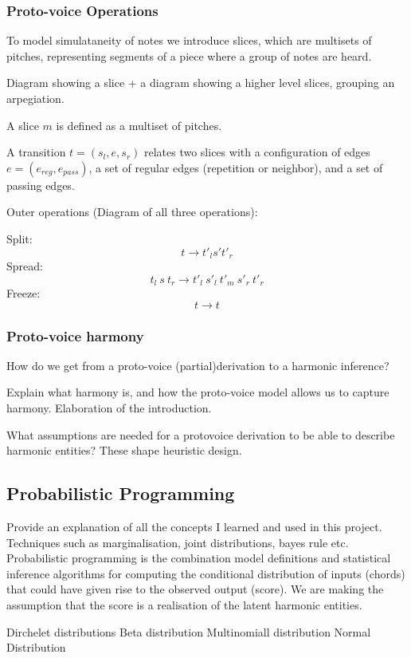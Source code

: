 \documentclass[12pt,a4paper,twoside,openright]{report}
\begin{document}
\subsubsection{Proto-voice Operations}

To model simulataneity of notes we introduce slices, which are multisets of pitches, representing segments of a piece where a group of notes are heard. 
\par 
Diagram showing a slice + a diagram showing a higher level slices, grouping an arpegiation.
\par 
A slice $m$ is defined as a multiset of pitches.
\par 
A transition $t = (s_l, e, s_r)$  relates two slices with a configuration of edges $e=(e_{reg}, e_{pass})$, a set of regular edges (repetition or neighbor), and a set of passing edges.
\par
Outer operations (Diagram of all three operations): 
\par
Split: \[t \to t'_l s' t'_r\]
Spread: \[t_l~s~t_r \to t'_l~s'_l~t'_m~s'_r~t'_r\]
Freeze: \[t \to t \]

\subsubsection{Proto-voice harmony}
How do we get from a proto-voice (partial)derivation to a harmonic inference?
\par
Explain what harmony is, and how the proto-voice model allows us to capture harmony. Elaboration of the introduction.
\par
What assumptions are needed for a protovoice derivation to be able to describe harmonic entities? These shape heuristic design.
\par


\subsection{Probabilistic Programming}
Provide an explanation of all the concepts I learned and used in this project. 
Techniques such as marginalisation, joint distributions, bayes rule etc. 
Probabilistic programming is the combination model definitions and statistical inference algorithms for computing the conditional distribution of inputs (chords) that could have given rise to the observed output (score). We are making the assumption that the score is a realisation of the latent harmonic entities. 

Dirchelet distributions
Beta distribution  
Multinomiall distribution 
Normal Distribution 
\end{document}
